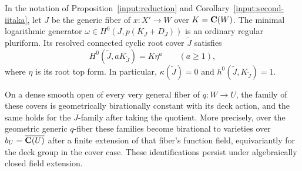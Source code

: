 \begin{corollary}
\label{prop:ordinary-period}
In the notation of Proposition~\ref{input:reduction} and
Corollary~\ref{input:second-iitaka}, let $J$ be the generic fiber of
$x:X'\to W$ over $K=\mathbf C(W)$. The minimal logarithmic generator
$\omega\in H^0(J,p(K_J+D_J))$ is an ordinary regular pluriform.
Its resolved connected cyclic root cover $\widetilde J$ satisfies
\[
 H^0(\widetilde J,aK_{\widetilde J})=K\eta^a
 \qquad(a\geq1),
\]
where $\eta$ is its root top form. In particular,
$\kappa(\widetilde J)=0$ and $h^0(\widetilde J,K_{\widetilde J})=1$.

On a dense smooth open of every very general fiber of $q:W\to U$,
the family of these covers is geometrically birationally constant
with its deck action, and the same holds for the $J$-family after
taking the quotient. More precisely, over the geometric generic
$q$-fiber these families become birational to varieties over
$b_U=\overline{\mathbf C(U)}$ after a finite extension of that fiber's
function field, equivariantly for the deck group in the cover case.
These identifications persist under algebraically closed field extension.
\end{corollary}

